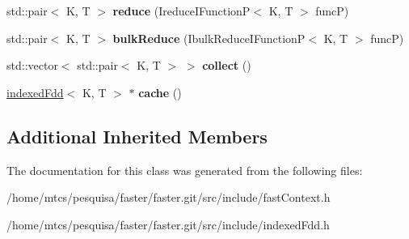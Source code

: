\begin{DoxyCompactItemize}
std\+::pair$<$ K, T $>$ {\bfseries reduce} (Ireduce\+I\+FunctionP$<$ K, T $>$ funcP)
\item 
\hypertarget{classfaster_1_1indexedFdd_ac3086716ca3ee4490d76cfb23bce1f62}{}\label{classfaster_1_1indexedFdd_ac3086716ca3ee4490d76cfb23bce1f62} 
std\+::pair$<$ K, T $>$ {\bfseries bulk\+Reduce} (Ibulk\+Reduce\+I\+FunctionP$<$ K, T $>$ funcP)
\item 
\hypertarget{classfaster_1_1indexedFdd_ae8222d15d17bb139bf07435227010607}{}\label{classfaster_1_1indexedFdd_ae8222d15d17bb139bf07435227010607} 
std\+::vector$<$ std\+::pair$<$ K, T $>$ $>$ {\bfseries collect} ()
\item 
\hypertarget{classfaster_1_1indexedFdd_adadcf78d4c0829655221ecdb29c952e2}{}\label{classfaster_1_1indexedFdd_adadcf78d4c0829655221ecdb29c952e2} 
\hyperlink{classfaster_1_1indexedFdd}{indexed\+Fdd}$<$ K, T $>$ $\ast$ {\bfseries cache} ()
\end{DoxyCompactItemize}
\subsection*{Additional Inherited Members}


The documentation for this class was generated from the following files\+:\begin{DoxyCompactItemize}
\item 
/home/mtcs/pesquisa/faster/faster.\+git/src/include/fast\+Context.\+h\item 
/home/mtcs/pesquisa/faster/faster.\+git/src/include/indexed\+Fdd.\+h\end{DoxyCompactItemize}
